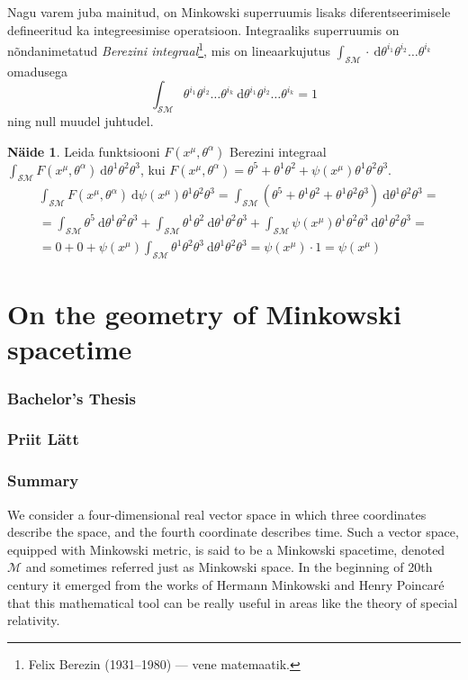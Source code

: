 \documentclass[12pt,a4paper,oneside]{article}
\theoremstyle{plain}
\theoremstyle{definition}
\newtheorem{naide}{Näide}[section]
\numberwithin{equation}{section}
\def\M{{\mathcal M}}
\def\SM{{\mathcal {SM}}}
\def\engtitle{On the geometry of Minkowski spacetime}
\def\author{Priit Lätt}
\begin{document}
Nagu varem juba mainitud, on Minkowski superruumis lisaks 
diferentseerimisele defineeritud ka integreesimise operatsioon. 
Integraaliks superruumis on nõnda\-nimetatud \emph{Berezini 
integraal}\footnote{Felix Berezin (1931--1980) --- vene 
matemaatik.}, mis on lineaarkujutus $\int_{\SM} 
\cdot \ \mathrm{d} \theta^{i_1} \theta^{i_2} \ldots \theta^{i_k}$ 
omadusega
\[\int_{\SM} \theta^{i_1} \theta^{i_2} 
	\ldots \theta^{i_k} \ 
	\mathrm{d} \theta^{i_1} \theta^{i_2} \ldots \theta^{i_k} = 1\]
ning null muudel juhtudel.

\begin{naide}
Leida funktsiooni $F\left(x^{\mu}, \theta^{\alpha}\right)$ 
Berezini integraal $\int_{\SM} F\left(x^{\mu}, 
\theta^{\alpha}\right) \ \mathrm{d} \theta^1 \theta^2 
\theta^3$, kui $F\left(x^{\mu}, \theta^{\alpha}\right) = 
	\theta^5 + \theta^1 \theta^2 + 
	\psi\left(x^{\mu}\right) \theta^1 \theta^2 \theta^3$.
\begin{align*}
&\int_{\SM} F\left(x^{\mu}, 
	\theta^{\alpha}\right) \ \mathrm{d} 
	\psi\left(x^{\mu}\right) \theta^1 \theta^2 \theta^3 = 
\int_{\SM} \left(\theta^5 + \theta^1 \theta^2 + 
	\theta^1 \theta^2 \theta^3\right) \ 
	\mathrm{d} \theta^1 \theta^2 \theta^3 = \\
&= \int_{\SM} \theta^5 \ \mathrm{d} \theta^1 \theta^2 \theta^3 +
\int_{\SM} \theta^1 \theta^2 \ 
	\mathrm{d} \theta^1 \theta^2 \theta^3 + 
\int_{\SM} \psi\left(x^{\mu}\right) 
	\theta^1 \theta^2 \theta^3 \ 
	\mathrm{d} \theta^1 \theta^2 \theta^3 = \\
&= 0 + 0 + \psi\left(x^{\mu}\right) 
	\int_{\SM} \theta^1 \theta^2 \theta^3 \ 
	\mathrm{d} \theta^1 \theta^2 \theta^3= 
	\psi\left(x^{\mu}\right) \cdot 1 = \psi\left(x^{\mu}\right)
\end{align*}
\end{naide}

\newpage
\selectlanguage{english}
\section*{\engtitle}

\subsubsection*{Bachelor's Thesis}
\subsubsection*{\author}
\subsubsection*{Summary}
We consider a four-dimensional real vector space in which 
three coordinates describe the space, and the fourth coordinate 
describes time. Such a vector space, equipped with Minkowski 
metric, is said to be a Minkowski spacetime, denoted $\M$ and 
sometimes referred just as Minkowski space. In the beginning 
of 20th century it emerged from the works of Hermann Minkowski 
and Henry Poincar\'e that this mathematical tool can be 
really useful in areas like the theory of special relativity.
\end{document}
